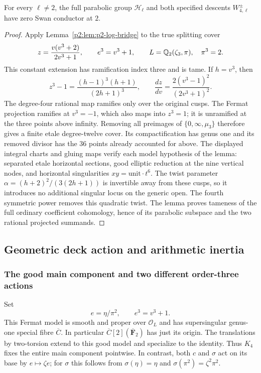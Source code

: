 \begin{corollary}
\label{p2:cor:true-cover-swan}
For every $\ell\ne2$, the full parabolic group $\mathcal H_\ell$ and
both specified descents $W_{4,\ell}^{\pm}$ have zero Swan conductor at $2$.
\end{corollary}
\begin{proof}
Apply Lemma~\ref{p2:lem:p2-log-bridge} to the true splitting cover
\[
 z=\frac{v(v^3+2)}{2v^3+1},\qquad e^3=v^3+1,
 \qquad L=\mathbb Q_2(\zeta_3,\pi),\quad \pi^3=2.
\]
This constant extension has ramification index three and is tame.
If $h=v^3$, then
\[
 z^3-1=\frac{(h-1)^3(h+1)}{(2h+1)^3},\qquad
 \frac{dz}{dv}=\frac{2(v^3-1)^2}{(2v^3+1)^2}.
\]
The degree-four rational map ramifies only over the original cusps.
The Fermat projection ramifies at $v^3=-1$, which also maps into
$z^3=1$; it is unramified at the three points above infinity.
Removing all preimages of $\{0,\infty,\mu_3\}$ therefore gives a finite
etale degree-twelve cover. Its compactification has genus one and
its removed divisor has the 36 points already accounted for above.
The displayed integral charts and gluing maps verify each model
hypothesis of the lemma: separated etale horizontal sections, good
elliptic reduction at the nine vertical nodes, and horizontal
singularities $xy=\text{unit}\cdot t^6$. The twist parameter $\alpha=(h+2)^2/(3(2h+1))$ is invertible away
from these cusps, so it introduces no additional singular locus on
the generic open. The fourth symmetric power removes this quadratic
twist. The lemma proves tameness
of the full ordinary coefficient cohomology, hence of its parabolic
subspace and the two rational projected summands.
\end{proof}
\subsection{Geometric deck action and arithmetic inertia}
\subsubsection{The good main component and two different order-three actions}
Set
\[
 e=\eta/\pi^2,\qquad e^3=v^3+1.
\]
This Fermat model is smooth and proper over $\mathcal O_L$ and has
supersingular genus-one special fibre $\overline C$.  In particular
$\overline C[2](\overline{\mathbf F}_2)$ has just its origin.
The translations by two-torsion extend to this good model and
specialize to the identity.  Thus $K_4$ fixes the entire main
component pointwise.  In contrast, both $c$ and $\sigma$ act on its
base by $e\mapsto\zeta e$; for $\sigma$ this follows from
$\sigma(\eta)=\eta$ and $\sigma(\pi^2)=\zeta^2\pi^2$.

